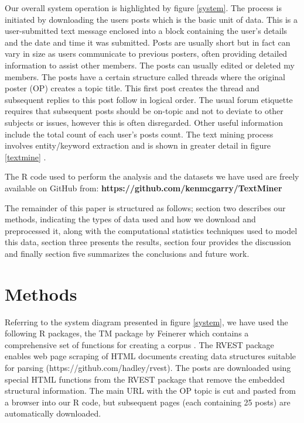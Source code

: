 \documentclass{svproc}
\begin{document}
Our overall system operation is highlighted by figure \ref{system}. The process is initiated by downloading the users posts which is the basic unit of data. This is a user-submitted text message enclosed into a block containing the user's details and the date and time it was submitted. Posts are usually short but in fact can vary in size as users communicate to previous posters, often providing detailed information to assist other members. The posts can usually edited or deleted my members. The posts have a certain structure called threads where the original poster (OP) creates a topic title. This first post creates the thread and subsequent replies to this post follow in logical order.  The usual forum etiquette requires that subsequent posts should be on-topic and not to deviate to other subjects or issues, however this is often disregarded. Other useful information include the total count of each user's posts count.
The text mining process involves entity/keyword  extraction and is shown in greater detail in figure \ref{textmine} \cite{Nahm02}.


The R code used to perform the analysis and the datasets we have used are freely available on GitHub from: {\bf https://github.com/kenmcgarry/TextMiner}

The remainder of this paper is structured as follows; section two describes our methods, indicating the types of  data used and how we download and preprocessed it, along with the  computational statistics techniques used to model this data, section three presents the results, section four provides the discussion and finally section five summarizes the conclusions and future work.


\section{Methods}
Referring to the system diagram presented in figure \ref{system}, we have used the following R packages, the TM package by Feinerer which contains a comprehensive set of functions for creating a corpus \cite{Feinerer2008}. The RVEST package enables web page scraping of HTML documents creating data structures suitable for parsing (https://github.com/hadley/rvest). The posts are downloaded using special HTML functions from the RVEST package that remove the embedded structural information. The main URL with the OP topic is cut and pasted from a browser into our R code, but subsequent pages (each containing 25 posts) are automatically downloaded.
\end{document}
